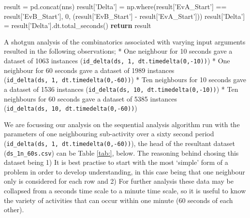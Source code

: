 \documentclass[11pt,]{article}
\newenvironment{Shaded}{\begin{snugshade}}{\end{snugshade}}
\newcommand{\ControlFlowTok}[1]{\textcolor[rgb]{0.12,0.11,0.11}{\textbf{#1}}}
\newcommand{\DecValTok}[1]{\textcolor[rgb]{0.69,0.50,0.00}{#1}}
\newcommand{\NormalTok}[1]{\textcolor[rgb]{0.12,0.11,0.11}{#1}}
\newcommand{\OperatorTok}[1]{\textcolor[rgb]{0.12,0.11,0.11}{#1}}
\newcommand{\StringTok}[1]{\textcolor[rgb]{0.75,0.01,0.01}{#1}}
\begin{document}
\begin{Shaded}
\begin{Highlighting}[]
\NormalTok{    result }\OperatorTok{=}\NormalTok{ pd.concat(nns)}
\NormalTok{    result[}\StringTok{'Delta'}\NormalTok{] }\OperatorTok{=}\NormalTok{ np.where(result[}\StringTok{'EvA_Start'}\NormalTok{] }\OperatorTok{==}\NormalTok{ result[}\StringTok{'EvB_Start'}\NormalTok{], }\DecValTok{0}\NormalTok{,}
\NormalTok{                               (result[}\StringTok{'EvB_Start'}\NormalTok{] }\OperatorTok{-}\NormalTok{ result[}\StringTok{'EvA_Start'}\NormalTok{]))}
\NormalTok{    result[}\StringTok{'Delta'}\NormalTok{] }\OperatorTok{=}\NormalTok{ result[}\StringTok{'Delta'}\NormalTok{].dt.total_seconds()}
    \ControlFlowTok{return}\NormalTok{ result}
\end{Highlighting}
\end{Shaded}

A shotgun analysis of the combinatorics associated with varying input
arguments resulted in the following observations; * One neighbour for 10
seconds gave a dataset of 1063 instances
(\texttt{id\_delta(ds,\ 1,\ dt.timedelta(0,-10))}) * One neighbour for
60 seconds gave a dataset of 1989 instances
(\texttt{id\_delta(ds,\ 1,\ dt.timedelta(0,-60))}) * Ten neighbours for
10 seconds gave a dataset of 1536 instances
(\texttt{id\_delta(ds,\ 10,\ dt.timedelta(0,-10))}) * Ten neighbours for
60 seconds gave a dataset of 5385 instances
(\texttt{id\_delta(ds,\ 10,\ dt.timedelta(0,-60))})

We are focussing our analysis on the sequential analysis algorithm run
with the parameters of one neighbouring sub-activity over a sixty second
period (\texttt{id\_delta(ds,\ 1,\ dt.timedelta(0,-60))}), the head of
the resultant dataset (\texttt{ds\_1n\_60s.csv}) can be Table
\ref{tab:}, below. The reasoning behind chosing this dataset being 1) It
is best practise to start with the most `simple' form of a problem in
order to develop understanding, in this case being that one neighbour
only is considered for each row and 2) For further analysis these data
may be collapsed from a seconds time scale to a minute time scale, so it
is useful to know the variety of activities that can occur within one
minute (60 seconds of each other).
\end{document}
